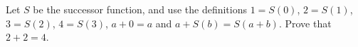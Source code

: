 Let $S$ be the successor function, and use the definitions $1=S(0)$, $2=S(1)$, $3=S(2)$, $4=S(3)$, $a+0=a$ and $a+S(b)=S(a+b)$. Prove that $2+2=4$.
